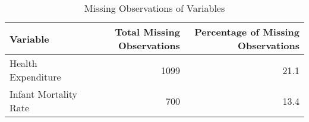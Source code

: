 \setcounter{table}{0}
\begin{table}[H]
\caption{Missing Observations of Variables}
\label{Table 1:missings}
\begin{tabular}{lrr}
\toprule
Variable & Total Missing Observations & Percentage of Missing Observations \\
\midrule
Health Expenditure & 1099 & 21.1 \\
Infant Mortality Rate & 700 & 13.4 \\
\bottomrule
\end{tabular}
\end{table}
